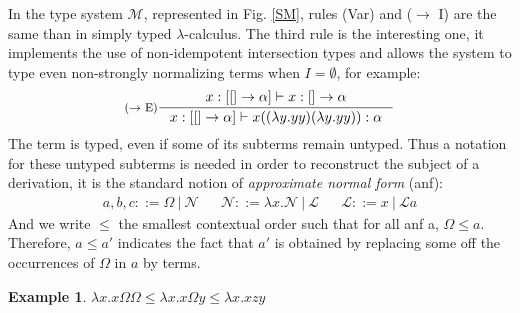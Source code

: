 \documentclass{article}
\newtheorem*{Ex*}{Example}
\def\sysm{system $\mathcal{M}$}
\begin{document}
In the type \sysm, represented in Fig. \ref{SM}, rules (Var) and ($\rightarrow$ I) are the same than in simply typed $\lambda$-calculus. The third rule is the interesting one, it implements the use of non-idempotent intersection types and allows the system to type even non-strongly normalizing terms when $I = \emptyset$, for example:
\begin{displaymath}
    \inference[($\rightarrow$ E)]{x:[[] \rightarrow \alpha] \vdash x : [] \rightarrow \alpha}{x : [[] \rightarrow \alpha] \vdash x((\lambda y.yy)(\lambda y.yy)) : \alpha}
\end{displaymath}
The term is typed, even if some of its subterms remain untyped. Thus a notation for these untyped subterms is needed in order to reconstruct the subject of a derivation, it is the standard notion of \emph{approximate normal form} (anf):
\begin{align*}
    a,b,c ::= \Omega\ |\ \mathcal{N} 
    && \mathcal{N} ::= \lambda x.\mathcal{N}\ |\ \mathcal{L}
    && \mathcal{L} ::= x\ |\ \mathcal{L}a
\end{align*}
And we write $\leq$ the smallest contextual order such that for all anf a, $\Omega \leq a$. Therefore, $a \leq a'$ indicates the fact that $a'$ is obtained by replacing some off the occurrences of $\Omega$ in $a$ by terms.

\begin{Ex*}
    $\lambda x.x\Omega\Omega \leq \lambda x.x\Omega y \leq \lambda x.xzy$
\end{Ex*}
\end{document}
